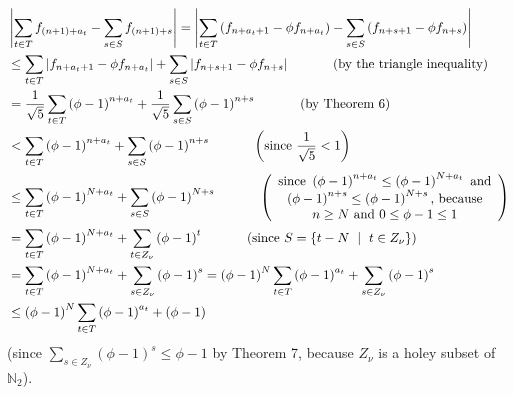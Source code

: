 \documentclass[12pt,final,notitlepage,onecolumn]{article}%
\begin{document}
\begin{align}
&  \left\vert \sum\limits_{t\in T}f_{\left(  n+1\right)  +a_{t}}%
-\sum\limits_{s\in S}f_{\left(  n+1\right)  +s}\right\vert =\left\vert
\sum\limits_{t\in T}\left(  f_{n+a_{t}+1}-\phi f_{n+a_{t}}\right)
-\sum\limits_{s\in S}\left(  f_{n+s+1}-\phi f_{n+s}\right)  \right\vert
\nonumber\\
&  \leq\sum\limits_{t\in T}\left\vert f_{n+a_{t}+1}-\phi f_{n+a_{t}%
}\right\vert +\sum\limits_{s\in S}\left\vert f_{n+s+1}-\phi f_{n+s}\right\vert
\ \ \ \ \ \ \ \ \ \ \left(  \text{by the triangle inequality}\right)
\nonumber\\
&  =\dfrac{1}{\sqrt{5}}\sum\limits_{t\in T}\left(  \phi-1\right)  ^{n+a_{t}%
}+\dfrac{1}{\sqrt{5}}\sum\limits_{s\in S}\left(  \phi-1\right)  ^{n+s}%
\ \ \ \ \ \ \ \ \ \ \left(  \text{by Theorem 6}\right) \nonumber\\
&  <\sum\limits_{t\in T}\left(  \phi-1\right)  ^{n+a_{t}}+\sum\limits_{s\in
S}\left(  \phi-1\right)  ^{n+s}\ \ \ \ \ \ \ \ \ \ \left(  \text{since }%
\dfrac{1}{\sqrt{5}}<1\right) \nonumber\\
&  \leq\sum\limits_{t\in T}\left(  \phi-1\right)  ^{N+a_{t}}+\sum\limits_{s\in
S}\left(  \phi-1\right)  ^{N+s}\ \ \ \ \ \ \ \ \ \ \left(
\begin{array}
[c]{c}%
\text{since }\left(  \phi-1\right)  ^{n+a_{t}}\leq\left(  \phi-1\right)
^{N+a_{t}}\text{ and}\\
\left(  \phi-1\right)  ^{n+s}\leq\left(  \phi-1\right)  ^{N+s}\text{,
because}\\
n\geq N\text{ and }0\leq\phi-1\leq1
\end{array}
\right) \nonumber\\
&  =\sum\limits_{t\in T}\left(  \phi-1\right)  ^{N+a_{t}}+\sum\limits_{t\in
Z_{\nu}}\left(  \phi-1\right)  ^{t}\ \ \ \ \ \ \ \ \ \ \left(  \text{since
}S=\left\{  t-N\ \mid\ t\in Z_{\nu}\right\}  \right) \nonumber\\
&  =\sum\limits_{t\in T}\left(  \phi-1\right)  ^{N+a_{t}}+\sum\limits_{s\in
Z_{\nu}}\left(  \phi-1\right)  ^{s}=\left(  \phi-1\right)  ^{N}\sum
\limits_{t\in T}\left(  \phi-1\right)  ^{a_{t}}+\sum\limits_{s\in Z_{\nu}%
}\left(  \phi-1\right)  ^{s}\nonumber\\
&  \leq\left(  \phi-1\right)  ^{N}\sum\limits_{t\in T}\left(  \phi-1\right)
^{a_{t}}+\left(  \phi-1\right)  \label{Estimate}%
\end{align}
(since $\sum\limits_{s\in Z_{\nu}}\left(  \phi-1\right)  ^{s}\leq\phi-1$ by
Theorem 7, because $Z_{\nu}$ is a holey subset of $\mathbb{N}_{2}$).
\end{document}

